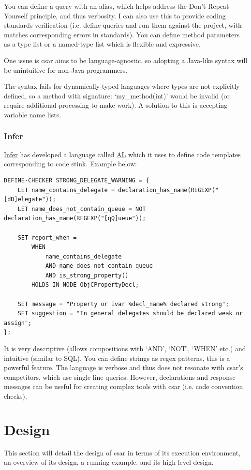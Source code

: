 \documentclass[12pt, letterpaper]{article}
\begin{document}
You can define a query with an alias, which helps address the Don't Repeat Yourself principle, and thus verbosity.
I can also use this to provide coding standards verification (i.e. define queries and run them against the project, with matches corresponding errors in standards).
You can define method parameters as a type list or a named-type list which is flexible and expressive.

One issue is csar aims to be language-agnostic, so adopting a Java-like syntax will be unintuitive for non-Java programmers.

The syntax fails for dynamically-typed languages where types are not explicitly defined, so a method with signature: `my\_method(int)' would be invalid (or require additional processing to make work).
A solution to this is accepting variable name lists.

\subsubsection{Infer}
\href{https://github.com/facebook/infer}{Infer} has developed a language called \href{https://code.facebook.com/posts/277643589367408/}{AL} which it uses to define code templates corresponding to code stink. Example below:  

\begin{lstlisting}
DEFINE-CHECKER STRONG_DELEGATE_WARNING = {
    LET name_contains_delegate = declaration_has_name(REGEXP("[dD]elegate"));
    LET name_does_not_contain_queue = NOT declaration_has_name(REGEXP("[qQ]ueue"));

    SET report_when =
        WHEN
            name_contains_delegate
            AND name_does_not_contain_queue
            AND is_strong_property()
        HOLDS-IN-NODE ObjCPropertyDecl;

    SET message = "Property or ivar %decl_name% declared strong";
    SET suggestion = "In general delegates should be declared weak or assign";
};
\end{lstlisting}

It is very descriptive (allows compositions with `AND', `NOT', `WHEN' etc.) and intuitive (similar to SQL). You can define strings as regex patterns, this is a powerful feature.
The language is verbose and thus does not resonate with csar's competitors, which use single line queries.
However, declarations and response messages can be useful for creating complex tools with csar (i.e. code convention checks).

\section{Design}
This section will detail the design of csar in terms of its execution environment, an overview of its design, a running example, and its high-level design.
\end{document}

